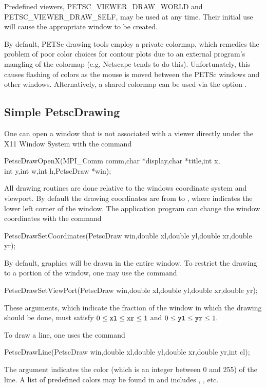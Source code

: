 {{{Predefined viewers, PETSC_VIEWER_DRAW_WORLD 
and PETSC_VIEWER_DRAW_SELF, may be used at any time. Their initial
use will cause the appropriate window to be created.

\medskip
By default, PETSc drawing tools employ a private colormap,
which remedies the problem of poor color choices for contour plots due
to an external program's mangling of the colormap (e.g, Netscape tends
to do this).
Unfortunately, this causes flashing of colors as the mouse is moved
between the PETSc windows and other windows.  Alternatively, a shared
colormap can be used via the option .

\subsection{Simple PetscDrawing}

One can open a window that is not associated with a viewer directly 
under the X11 Window System with the
command 
\begin{tabbing}
  PetscDrawOpenX(MPI\_Comm comm,char *display,char *title,int x,\\
                 int y,int w,int h,PetscDraw *win);
\end{tabbing}
All drawing routines are done relative to the windows coordinate system 
and viewport. By default the drawing coordinates are from  to 
, where  indicates the lower left corner of the 
window. The application program can change the window coordinates with the 
command  
\begin{tabbing}
  PetscDrawSetCoordinates(PetscDraw win,double xl,double yl,double xr,double yr);
\end{tabbing}
By default, graphics will be drawn in the entire window. To restrict the 
drawing to a portion of the window, one may 
use the command 
\begin{tabbing}
  PetscDrawSetViewPort(PetscDraw win,double xl,double yl,double xr,double yr);
\end{tabbing}
These arguments, which indicate the fraction of the window in which the 
drawing should be done, must satisfy 
$ 0 \leq {\tt xl} \leq {\tt xr} \leq 1 $ and $ 0 \leq {\tt yl} \leq {\tt yr} \leq 1.$ 

To draw a line, one uses
 the command 
\begin{tabbing}
  PetscDrawLine(PetscDraw win,double xl,double yl,double xr,double yr,int cl);
\end{tabbing}
The argument  indicates the color (which is an integer between 0 and 255)
of the line. A list of predefined colors may be found in 
and includes , ,  etc.

}}}
